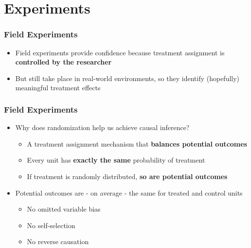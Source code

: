 \documentclass[xcolor=x11names,compress]{beamer}\usepackage[]{graphicx}\usepackage[]{xcolor}
\renewcommand{\(}{\begin{columns}}
\renewcommand{\)}{\end{columns}}
\newcommand{\<}[1]{\begin{column}{#1}}
\renewcommand{\>}{\end{column}}
\begin{document}
\section{Experiments}

\begin{frame} 
\frametitle{Field Experiments}
\begin{itemize}
\item Field experiments provide confidence because treatment assignment is \textbf{controlled by the researcher}
\item But still take place in real-world environments, so they identify (hopefully) meaningful treatment effects
\end{itemize}
\end{frame}

\begin{frame}
\frametitle{Field Experiments}
\begin{itemize}
\item Why does randomization help us achieve causal inference?
\pause
\begin{itemize}
\item A treatment assignment mechanism that \textbf{balances potential outcomes}
\item Every unit has \textbf{exactly the same} probability of treatment
\item If treatment is randomly distributed, \textbf{so are potential outcomes}
\end{itemize}
\item Potential outcomes are - on average - the same for treated and control units
\begin{itemize}
\item No omitted variable bias
\item No self-selection
\item No reverse causation
\end{itemize}
\end{itemize}
\end{frame}
\end{document}
